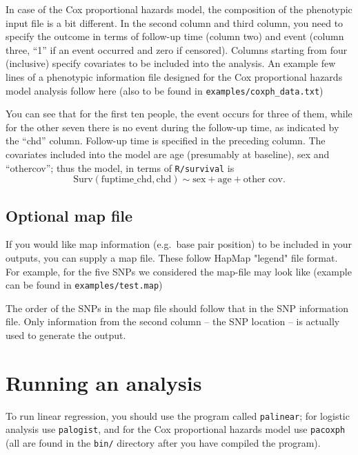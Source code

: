 \documentclass[12pt,a4paper]{article}
\begin{document}
In case of the Cox proportional hazards model, the composition of the
phenotypic input file is a bit different. In the second column and
third column, you need to specify the outcome in terms of follow-up
time (column two) and event (column three, ``1'' if an event occurred
and zero if censored). Columns starting from four (inclusive) specify
covariates to be included into the analysis. An example few lines of
a phenotypic information file designed for the Cox proportional hazards model
analysis follow here (also to be found in
\texttt{examples/coxph\_data.txt})


You can see that for the first ten people, the event occurs for three of
them, while for the other seven there is no event during the follow-up
time, as indicated by the ``chd'' column. Follow-up time is specified in the preceding
column. The covariates included into the model are age (presumably
at baseline), sex and ``othercov''; thus the model, in terms of
\texttt{R/survival} is
\begin{equation*}
\textrm{Surv}(\textrm{fuptime\_chd}, \textrm{chd})
\sim \textrm{sex} + \textrm{age} + \textrm{other cov}.
\end{equation*}

\subsection{Optional map file}
If you would like map information (e.g.~base pair position) to
be included in your outputs, you can supply a map file. These follow
HapMap "legend" file format. For example, for the five SNPs we considered
the map-file may look like (example can be found in
\texttt{examples/test.map})



The order of the SNPs in the map file should follow that in the SNP information
file. Only information from the second column -- the SNP location -- is
actually used to generate the output.

\section{Running an analysis}
\label{sec:runanalysis}
To run linear regression, you should use the program called
\texttt{palinear}; for logistic analysis use \texttt{palogist}, and
for the Cox proportional hazards model use \texttt{pacoxph} (all are
found in the \texttt{bin/} directory after you have compiled the
program).
\end{document}
